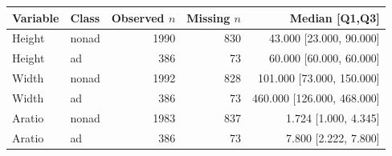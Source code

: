 \begin{tabular}{llrrr}\toprule
Variable & Class & Observed $n$ & Missing $n$ & Median [Q1,Q3]\\\midrule
Height & nonad & 1990 & 830 & 43.000 [23.000, 90.000]\\
Height & ad & 386 & 73 & 60.000 [60.000, 60.000]\\
Width & nonad & 1992 & 828 & 101.000 [73.000, 150.000]\\
Width & ad & 386 & 73 & 460.000 [126.000, 468.000]\\
Aratio & nonad & 1983 & 837 & 1.724 [1.000, 4.345]\\
Aratio & ad & 386 & 73 & 7.800 [2.222, 7.800]\\
\bottomrule\end{tabular}
